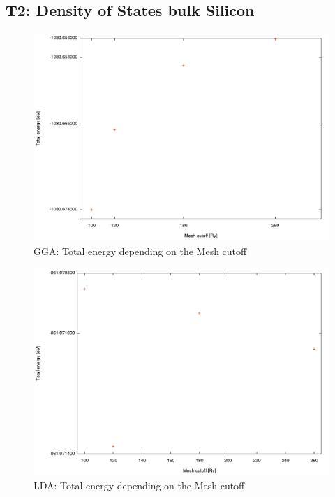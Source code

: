 \documentclass[12pt,a4paper]{scrartcl}
\begin{document}
\subsection{T2: Density of States bulk Silicon}
\begin{figure}[H]
\begin{center}
\includegraphics[width=12.0cm]{plots/GGA_mesh.pdf}
\end{center}
\caption{GGA: Total energy depending on the Mesh cutoff}
\end{figure}
\begin{figure}[H]
\begin{center}
\includegraphics[width=12.0cm]{plots/LDA_mesh.pdf}
\end{center}
\caption{LDA: Total energy depending on the Mesh cutoff}
\end{figure}
\end{document}
